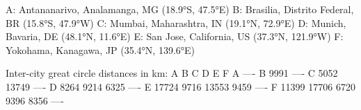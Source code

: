 \begin{exercise}
\begin{stdout}
A: Antananarivo, Analamanga, MG (18.9°S, 47.5°E)
B: Brasilia, Distrito Federal, BR (15.8°S, 47.9°W)
C: Mumbai, Maharashtra, IN (19.1°N, 72.9°E)
D: Munich, Bavaria, DE (48.1°N, 11.6°E)
E: San Jose, California, US (37.3°N, 121.9°W)
F: Yokohama, Kanagawa, JP (35.4°N, 139.6°E)

Inter-city great circle distances in km:
        A       B       C       D       E       F    
A      ----
B      9991    ----
C      5052   13749    ----
D      8264    9214    6325    ----
E     17724    9716   13553    9459    ----
F     11399   17706    6720    9396    8356    ---- 
\end{stdout}

\end{exercise}
